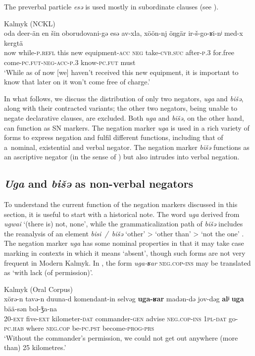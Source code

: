 \documentclass[output=paper]{langsci/langscibook}
\begin{document}
The preverbal particle \textit{esǝ} is used mostly in subordinate clauses (see \citealp{baranova2019a}).

\ea Kalmyk (NCKL) \label{ex:BK33}\\
	\gll oda	deer-än			en		šin		oborudovani-gə	esə	av-xla,			xöön-nj	öŋgär	ir-š-go-ʁi-nʲ	med-x				kergtä\\
	now	while-\textsc{p.refl}	this	new	equipment-\textsc{acc}	\textsc{neg}	take-\textsc{cvb.suc}	after-\textsc{p.3}	for.free	come-\textsc{pc.fut-neg-acc-p.3}	know-\textsc{pc.fut}	must\\
	\glt `While as of now [we] haven’t received this new equipment, it is important to know that later on it won’t come free of charge.'
\z


In what follows, we discuss the distribution of only two negators, \textit{uga} and \textit{bišǝ}, along with their contracted variants; the other two negators, being unable to negate declarative clauses, are excluded. Both \textit{uga} and \textit{bišǝ}, on the other hand, can function as SN markers. The negation marker \textit{uga} is used in a rich variety of forms to express negation and fulfil different functions, including that of a nominal, existential and verbal negator. The negation marker \textit{bišǝ} functions as an ascriptive negator (in the sense of \citealp{Veselinova2015}) but also intrudes into verbal negation. 

\subsection{\textit{Uga} and \textit{bišǝ} as non-verbal negators}\label{sec:BK3.2}

To understand the current function of the negation markers discussed in this section, it is useful to start with a historical note. The word \textit{uga} derived from \textit{ugwai} ‘(there is) not, none’, while the grammaticalization path of \textit{bišǝ} includes the reanalysis of an element \textit{bisi / bišǝ} ‘other’ > ‘other than’ > ‘not the one’ \citep[250–251]{janhunen2012a}. The negation marker \textit{uga} has some nominal properties in that it may take case marking in contexts in which it means ‘absent’, though such forms are not very frequent in Modern Kalmyk. In , the form \textit{uga-ʁar} \textsc{neg.cop-ins} may be translated as ‘with lack (of permission)’.

\ea Kalmyk (Oral Corpus) \label{ex:BK34}\\
	\gll xörǝ-n		tavǝ-n	duuna-d			komendant-in		selvǝg	\textbf{uga-ʁar}			madǝn-dǝ	jov-dǝg		\textbf{alʲ}			\textbf{uga}	bää-sǝn		bol-ǯa-na\\
	20-\textsc{ext}	five-\textsc{ext}	kilometer-\textsc{dat}	commander-\textsc{gen}	advise	\textsc{neg.cop-ins}	\textsc{1pl-dat}		go-\textsc{pc.hab}	where	\textsc{neg.cop}	be-\textsc{pc.pst}	become-\textsc{prog-prs}\\
	\glt `Without the commander’s permission, we could not get out anywhere (more than) 25 kilometres.'
\z
\end{document}
